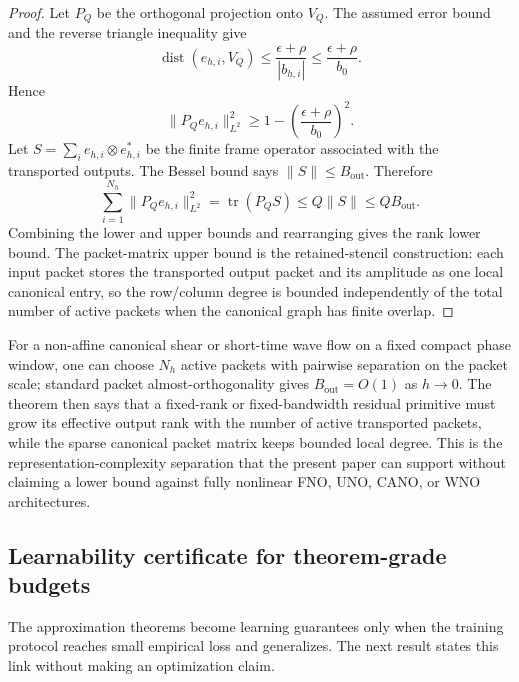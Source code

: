 \begin{proof}
Let $P_Q$ be the orthogonal projection onto $V_Q$.  The assumed error bound and
the reverse triangle inequality give
\[
\operatorname{dist}(e_{h,i},V_Q)
\le \frac{\epsilon+\rho}{|b_{h,i}|}
\le \frac{\epsilon+\rho}{b_0}.
\]
Hence
\[
\|P_Q e_{h,i}\|_{L^2}^2
\ge
1-\left(\frac{\epsilon+\rho}{b_0}\right)^2 .
\]
Let $S=\sum_i e_{h,i}\otimes e_{h,i}^\ast$ be the finite frame operator
associated with the transported outputs.  The Bessel bound says
$\|S\|\le B_{\mathrm{out}}$.  Therefore
\[
\sum_{i=1}^{N_h}\|P_Qe_{h,i}\|_{L^2}^2
=\operatorname{tr}(P_QS)
\le Q\|S\|
\le QB_{\mathrm{out}}.
\]
Combining the lower and upper bounds and rearranging gives the rank lower
bound.  The packet-matrix upper bound is the retained-stencil construction:
each input packet stores the transported output packet and its amplitude as one
local canonical entry, so the row/column degree is bounded independently of
the total number of active packets when the canonical graph has finite overlap.
\end{proof}

For a non-affine canonical shear or short-time wave flow on a fixed compact
phase window, one can choose $N_h$ active packets with pairwise separation on
the packet scale; standard packet almost-orthogonality gives
$B_{\mathrm{out}}=O(1)$ as $h\to0$.  The theorem then says that a fixed-rank
or fixed-bandwidth residual primitive must grow its effective output rank with
the number of active transported packets, while the sparse canonical packet
matrix keeps bounded local degree.  This is the representation-complexity
separation that the present paper can support without claiming a lower bound
against fully nonlinear FNO, UNO, CANO, or WNO architectures.

\subsection{Learnability certificate for theorem-grade budgets}

The approximation theorems become learning guarantees only when the training
protocol reaches small empirical loss and generalizes.  The next result states
this link without making an optimization claim.

